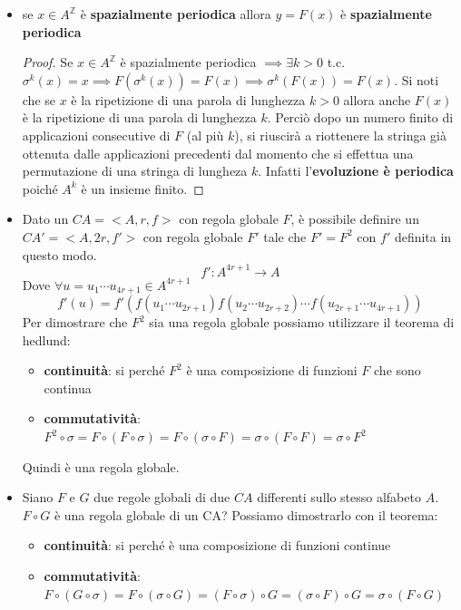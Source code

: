 \begin{itemize}
    \item se $x\in A^\mathbb{Z}$ è \textbf{spazialmente periodica} allora $y=F(x)$
          è  \textbf{spazialmente periodica}
          \begin{proof}
              Se $x\in A^\mathbb{Z}$  è spazialmente periodica $\implies\exists k>0$ t.c.
              $\sigma^k(x)=x \implies F(\sigma^k(x)) = F(x)\implies \sigma^k(F(x))=F(x)$.
              Si noti che se $x$ è la ripetizione di una parola di lunghezza $k>0$ allora
              anche $F(x)$ è la ripetizione di una parola di lunghezza $k$. Perciò dopo
              un numero finito di applicazioni consecutive di $F$ (al più $k$), si riuscirà
              a riottenere la stringa già ottenuta dalle applicazioni precedenti dal momento
              che si effettua una permutazione di una stringa di lungheza $k$. Infatti l'\textbf{evoluzione
                  è  periodica} poiché $A^k$ è un insieme finito.
          \end{proof}
    \item Dato un $CA = <A,r,f>$ con regola globale $F$, è possibile definire un  $CA '= <A,2r,f'>$
          con regola globale $F'$ tale che $F'=F^2$ con $f'$ definita in questo modo.
          $$f':A^{4r+1}\rightarrow A$$
          Dove $\forall u=u_1\cdots u_{4r+1}\in A^{4r+1}$
          $$f'(u) = f'(f(u_1\cdots u_{2r+1})f(u_{2}\cdots u_{2r+2})\cdots f(u_{2r+1}\cdots u_{4r+1}))$$
          Per dimostrare che $F^2$ sia una regola globale possiamo utilizzare il teorema di
          hedlund:
          \begin{itemize}
              \item \textbf{continuità}: si perché $F^2$ è una composizione di funzioni $F$
                    che sono continua
              \item \textbf{commutatività}: $F^2\circ \sigma = F\circ (F\circ \sigma ) = F\circ (\sigma\circ F  ) = \sigma\circ (F\circ F  )  = \sigma \circ F^2$
          \end{itemize}
          Quindi è una regola globale.
    \item Siano $F$ e $G$ due regole globali di due $CA$ differenti sullo stesso
          alfabeto $A$. $F\circ G$ è una regola globale di un CA? Possiamo dimostrarlo con
          il teorema:
          \begin{itemize}
              \item \textbf{continuità}: si perché è una composizione di funzioni continue
              \item \textbf{commutatività}: $F\circ (G\circ \sigma) = F\circ (\sigma\circ G) = (F\circ \sigma)\circ G =(\sigma\circ F)\circ G = \sigma\circ (F\circ G)$

\end{itemize}
\end{itemize}
